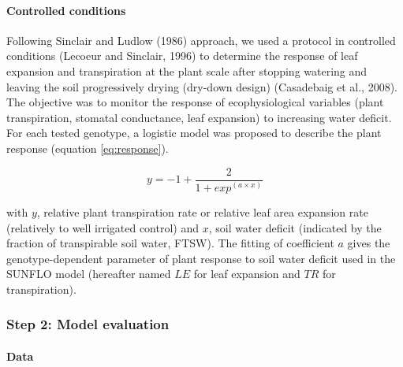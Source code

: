 \documentclass[a4paper]{article}
\let\oldparagraph\paragraph
\renewcommand{\paragraph}[1]{\oldparagraph{#1}\mbox{}}
\begin{document}
\paragraph{Controlled conditions}\label{controlled-conditions}

Following Sinclair and Ludlow (1986) approach, we used a protocol in
controlled conditions (Lecoeur and Sinclair, 1996) to determine the
response of leaf expansion and transpiration at the plant scale after
stopping watering and leaving the soil progressively drying (dry-down
design) (Casadebaig et al., 2008). The objective was to monitor the
response of ecophysiological variables (plant transpiration, stomatal
conductance, leaf expansion) to increasing water deficit. For each
tested genotype, a logistic model was proposed to describe the plant
response (equation \ref{eq:response}).

\begin{equation}
 y = -1 + \frac{2}{1 + exp^{(a \times x)}}
 \label{eq:response}
\end{equation}

with \(y\), relative plant transpiration rate or relative leaf area
expansion rate (relatively to well irrigated control) and \(x\), soil
water deficit (indicated by the fraction of transpirable soil water,
FTSW). The fitting of coefficient \(a\) gives the genotype-dependent
parameter of plant response to soil water deficit used in the SUNFLO
model (hereafter named \(LE\) for leaf expansion and \(TR\) for
transpiration).

\subsubsection{Step 2: Model evaluation}\label{step-2-model-evaluation}

\paragraph{Data}\label{data}
\end{document}
